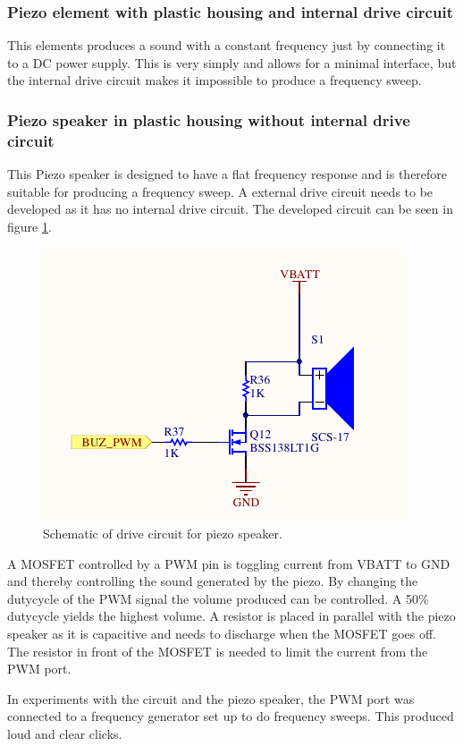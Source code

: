\subsubsection*{Piezo element with plastic housing and internal drive circuit}
This elements produces a sound with a constant frequency just by connecting it to a DC power supply. 
This is very simply and allows for a minimal interface, but the internal drive circuit makes it impossible to produce a frequency sweep. 

\subsubsection*{Piezo speaker in plastic housing without internal drive circuit}
This Piezo speaker is designed to have a flat frequency response and is therefore suitable for producing a frequency sweep. 
A external drive circuit needs to be developed as it has no internal drive circuit.
The developed circuit can be seen in figure \ref{fig:buzzer_circuit}.

\begin{figure}
	\centering
	\includegraphics[width=.6\linewidth]{graphics/buzzer_circuit.pdf}
	\caption{Schematic of drive circuit for piezo speaker.}
	\label{fig:buzzer_circuit}
\end{figure}

A MOSFET controlled by a PWM pin is toggling current from VBATT to GND and thereby controlling the sound generated by the piezo.
By changing the dutycycle of the PWM signal the volume produced can be controlled. 
A 50\% dutycycle yields the highest volume. 
A resistor is placed in parallel with the piezo speaker as it is capacitive and needs to discharge when the MOSFET goes off.
The resistor in front of the MOSFET is needed to limit the current from the PWM port. 

In experiments with the circuit and the piezo speaker, the PWM port was connected to a frequency generator set up to do frequency sweeps.
This produced loud and clear clicks.

